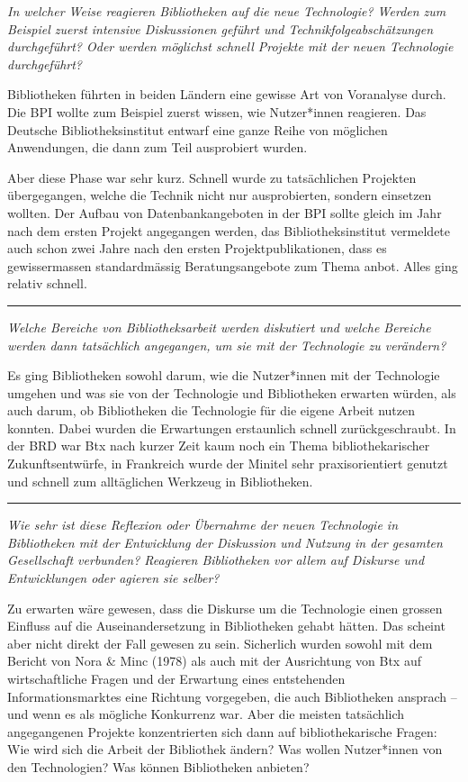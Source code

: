 \documentclass[a4paper,
fontsize=11pt,
oneside,
numbers=noperiodatend,
parskip=half-,
bibliography=totoc,
final
]{scrartcl}
\begin{document}
\emph{In welcher Weise reagieren Bibliotheken auf die neue Technologie?
Werden zum Beispiel zuerst intensive Diskussionen geführt und
Technikfolgeabschätzungen durchgeführt? Oder werden möglichst schnell
Projekte mit der neuen Technologie durchgeführt?}

Bibliotheken führten in beiden Ländern eine gewisse Art von Voranalyse
durch. Die BPI wollte zum Beispiel zuerst wissen, wie Nutzer*innen
reagieren. Das Deutsche Bibliotheksinstitut entwarf eine ganze Reihe von
möglichen Anwendungen, die dann zum Teil ausprobiert wurden.

Aber diese Phase war sehr kurz. Schnell wurde zu tatsächlichen Projekten
übergegangen, welche die Technik nicht nur ausprobierten, sondern
einsetzen wollten. Der Aufbau von Datenbankangeboten in der BPI sollte
gleich im Jahr nach dem ersten Projekt angegangen werden, das
Bibliotheksinstitut vermeldete auch schon zwei Jahre nach den ersten
Projektpublikationen, dass es gewissermassen standardmässig
Beratungsangebote zum Thema anbot. Alles ging relativ schnell.

\begin{center}\rule{0.5\linewidth}{0.5pt}\end{center}

\emph{Welche Bereiche von Bibliotheksarbeit werden diskutiert und welche
Bereiche werden dann tatsächlich angegangen, um sie mit der Technologie
zu verändern?}

Es ging Bibliotheken sowohl darum, wie die Nutzer*innen mit der
Technologie umgehen und was sie von der Technologie und Bibliotheken
erwarten würden, als auch darum, ob Bibliotheken die Technologie für die
eigene Arbeit nutzen konnten. Dabei wurden die Erwartungen erstaunlich
schnell zurückgeschraubt. In der BRD war Btx nach kurzer Zeit kaum noch
ein Thema bibliothekarischer Zukunftsentwürfe, in Frankreich wurde der
Minitel sehr praxisorientiert genutzt und schnell zum alltäglichen
Werkzeug in Bibliotheken.

\begin{center}\rule{0.5\linewidth}{0.5pt}\end{center}

\emph{Wie sehr ist diese Reflexion oder Übernahme der neuen Technologie
in Bibliotheken mit der Entwicklung der Diskussion und Nutzung in der
gesamten Gesellschaft verbunden? Reagieren Bibliotheken vor allem auf
Diskurse und Entwicklungen oder agieren sie selber?}

Zu erwarten wäre gewesen, dass die Diskurse um die Technologie einen
grossen Einfluss auf die Auseinandersetzung in Bibliotheken gehabt
hätten. Das scheint aber nicht direkt der Fall gewesen zu sein.
Sicherlich wurden sowohl mit dem Bericht von Nora \& Minc (1978) als
auch mit der Ausrichtung von Btx auf wirtschaftliche Fragen und der
Erwartung eines entstehenden Informationsmarktes eine Richtung
vorgegeben, die auch Bibliotheken ansprach -- und wenn es als mögliche
Konkurrenz war. Aber die meisten tatsächlich angegangenen Projekte
konzentrierten sich dann auf bibliothekarische Fragen: Wie wird sich die
Arbeit der Bibliothek ändern? Was wollen Nutzer*innen von den
Technologien? Was können Bibliotheken anbieten?
\end{document}
